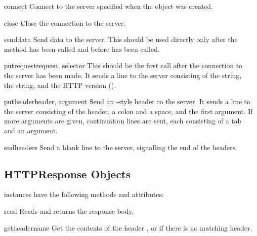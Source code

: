 \begin{methoddesc}{connect}{}
Connect to the server specified when the object was created.
\end{methoddesc}

\begin{methoddesc}{close}{}
Close the connection to the server.
\end{methoddesc}

\begin{methoddesc}{send}{data}
Send data to the server.  This should be used directly only after the
 method has been called and before
 has been called.
\end{methoddesc}

\begin{methoddesc}{putrequest}{request, selector}
This should be the first call after the connection to the server has
been made.  It sends a line to the server consisting of the
 string, the  string, and the HTTP version
().
\end{methoddesc}

\begin{methoddesc}{putheader}{header, argument}
Send an -style header to the server.  It sends a line to the
server consisting of the header, a colon and a space, and the first
argument.  If more arguments are given, continuation lines are sent,
each consisting of a tab and an argument.
\end{methoddesc}

\begin{methoddesc}{endheaders}{}
Send a blank line to the server, signalling the end of the headers.
\end{methoddesc}


\subsection{HTTPResponse Objects \label{httpresponse-objects}}

 instances have the following methods and attributes:

\begin{methoddesc}{read}{}
Reads and returns the response body.
\end{methoddesc}

\begin{methoddesc}{getheader}{name}
Get the contents of the header , or  if there is no
matching header.
\end{methoddesc}

